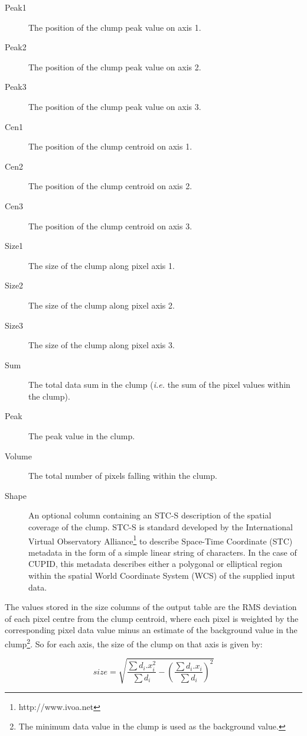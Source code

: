 \documentclass[final,authoryear,5p,times,twocolumn]{elsarticle}
\begin{document}
\begin{enumerate}
\begin{description}
\item[Peak1] The position of the clump peak value on axis 1.
\item[Peak2] The position of the clump peak value on axis 2.
\item[Peak3] The position of the clump peak value on axis 3.
\item[Cen1] The position of the clump centroid on axis 1.
\item[Cen2] The position of the clump centroid on axis 2.
\item[Cen3] The position of the clump centroid on axis 3.
\item[Size1] The size of the clump along pixel axis 1.
\item[Size2] The size of the clump along pixel axis 2.
\item[Size3] The size of the clump along pixel axis 3.
\item[Sum] The total data sum in the clump (\emph{i.e.} the sum of the
pixel values within the clump).
\item[Peak] The peak value in the clump.
\item[Volume] The total number of pixels falling within the clump.
\item[Shape] An optional column containing an STC-S description
\citep{2007STCS,2007STC,2010ASPC..434..213B} of the spatial coverage
of the clump. STC-S is standard developed by the International Virtual
Observatory Alliance\footnote{http://www.ivoa.net} to describe Space-Time
Coordinate (STC) metadata in the form of a simple linear string of
characters. In the case of CUPID, this metadata describes either a
polygonal or elliptical region within the spatial World Coordinate
System (WCS) of the supplied input data.
\end{description}

\end{enumerate}

The values stored in the size columns of the output table are the RMS
deviation of each pixel centre from the clump centroid, where each pixel
is weighted by the corresponding pixel data value minus an estimate of
the background value in the clump\footnote{The minimum data value in the
clump is used as the background value.}. So for each axis, the size of
the clump on that axis is given by:

\[ size = \sqrt{ \frac{ \sum d_{i}.x_{i}^{2} }{ \sum d_{i} } -
\left( \frac{\sum d_{i}.x_{i} }{\sum d_{i}}  \right)^2 } \]
\end{document}
